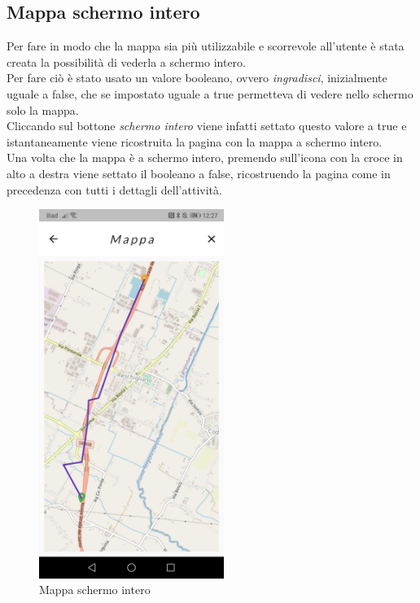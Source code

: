 \newpage

\subsection{Mappa schermo intero}
Per fare in modo che la mappa sia più utilizzabile e scorrevole all'utente è stata creata la possibilità di vederla a schermo intero.\\
Per fare ciò è stato usato un valore booleano, ovvero \textit{ingradisci}, inizialmente uguale a false, che se impostato uguale a true permetteva di vedere nello schermo solo la mappa.\\
Cliccando sul bottone \textit{schermo intero} viene infatti settato questo valore a true e istantaneamente viene ricostruita la pagina con la mappa a schermo intero.\\
Una volta che la mappa è a schermo intero, premendo sull'icona con la croce in alto a destra viene settato il booleano a false, ricostruendo la pagina come in precedenza con tutti i dettagli dell'attività.\\

\begin{figure}[htbp]	
	\centering
	\includegraphics[width=6cm]{immagini/mappaintero.jpeg}
	\caption{Mappa schermo intero}
	\label{fig:Mappa schermo intero}
\end{figure}

\newpage

